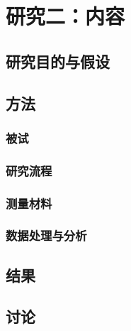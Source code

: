 \chapter{研究二：内容}
\section{研究目的与假设}

\section{方法}

\subsection{被试}

\subsection{研究流程}


\subsection{测量材料}


\subsection{数据处理与分析}


\section{结果}

\section{讨论}
